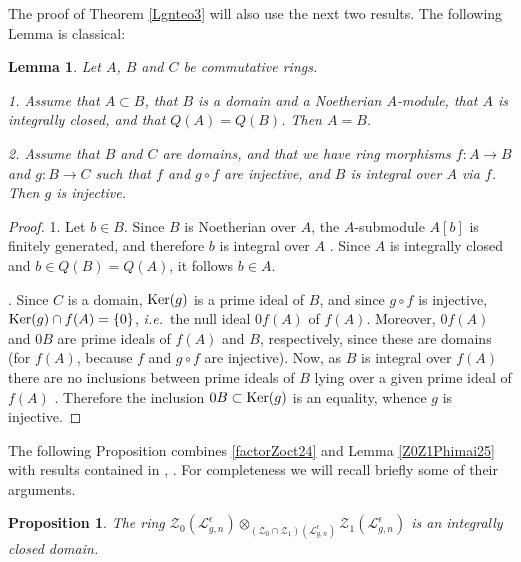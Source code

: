 \documentclass[11pt]{amsart}
\newtheorem{lem}[teo]{Lemma}
\newtheorem{prop}[teo]{Proposition}
\newcommand{\e}{\epsilon}
\begin{document}
The proof of Theorem \ref{Lgnteo3} will also use the next two results. The following Lemma is classical:
\begin{lem}\label{lemTechnicalCommRings}
Let $A$, $B$ and $C$ be commutative rings.

1. Assume that $A\subset B$, that $B$ is a domain and a Noetherian $A$-module, that $A$ is integrally closed, and that $Q(A)=Q(B)$. Then $A=B$.

2. Assume that $B$ and $C$ are domains, and that we have ring morphisms $f\colon A\to B$ and $g\colon B\to C$ such that $f$ and $g\circ f$ are injective, and $B$ is integral over $A$ via $f$. Then $g$ is injective.
\end{lem}

\begin{proof}
1. Let $b\in B$. Since $B$ is Noetherian over $A$, the $A$-submodule $A[b]$ is finitely generated, and therefore $b$ is integral over $A$ \cite[Prop.\,5.1]{AMacD}. Since $A$ is integrally closed and $b\in Q(B)=Q(A)$, it follows $b\in A$. 

. Since $C$ is a domain, ${\rm Ker}(g)$ is a prime ideal of $B$, and since $g\circ f$ is injective, ${\rm Ker}(g)\cap f(A) = \{0\}$, {\it i.e.}\, the null ideal $0f(A)$ of $f(A)$. Moreover, $0f(A)$ and $0B$ are prime ideals of $f(A)$ and $B$, respectively, since these are domains (for $f(A)$, because  $f$ and $g\circ f$ are injective). Now, as $B$ is integral over $f(A)$ there are no inclusions between prime ideals of $B$ lying over a given prime ideal of $f(A)$ \cite[Th.\,9.3 (ii)]{Matsumura}. Therefore the inclusion $0B\subset {\rm Ker}(g)$ is an equality, whence $g$ is injective. 
\end{proof}

The following Proposition combines \eqref{factorZoct24} and Lemma \ref{Z0Z1Phimai25} with results contained in \cite[\S 6]{DC-K-P1}, \cite[\S 21]{DCP}. For completeness we will recall briefly some of their arguments.

\begin{prop}\label{mainDCKPsec6} The ring $\mathcal{Z}_0(\mathcal{L}_{g,n}^{\e}) \otimes_{(\mathcal{Z}_0 \cap \mathcal{Z}_1)(\mathcal{L}_{g,n}^{\e})} \mathcal{Z}_1(\mathcal{L}_{g,n}^{\e})$ is an integrally closed domain.
\end{prop}
\end{document}
